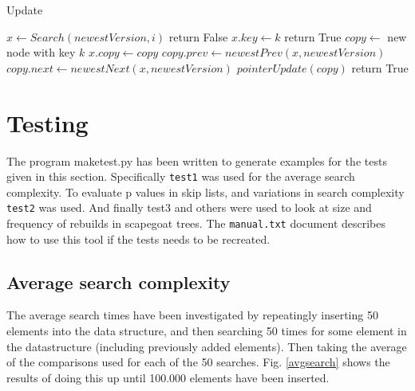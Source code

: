 \documentclass[12pt, a4paper]{article}
\begin{document}
\begin{algorithm}
\caption{Update}\label{update}
\begin{algorithmic}[1]
    \State $x \gets Search(newestVersion, i)$
        \State return False
    \endIf
        \State $x.key \gets k$
        \State return True
    \EndIf
    \State $copy \gets$ new node with key $k$
    \State $x.copy \gets copy$
    \State $copy.prev \gets newestPrev(x, newestVersion)$
    \State $copy.next \gets newestNext(x, newestVersion)$
    \State $pointerUpdate(copy)$
    \State return True
\EndProcedure
\end{algorithmic}
\end{algorithm}

\medskip




\section*{Testing}
The program maketest.py has been written to generate examples for the tests given in this section. 
Specifically \texttt{test1} was used for the average search complexity.
To evaluate p values in skip lists, and variations in search complexity \texttt{test2} was used. 
And finally test3 and others were used to look at size and frequency of rebuilds in scapegoat trees.
The \texttt{manual.txt} document describes how to use this tool if the tests needs to be recreated.

\subsection*{Average search complexity}
The average search times have been investigated by repeatingly inserting 50 elements into the data structure, and then searching 50 times for some 
element in the datastructure (including previously added elements). Then taking the average of the comparisons used for each of the 50 searches.
Fig. \ref{avgsearch} shows the results of doing this up until 100.000 elements have been inserted.
\end{document}

